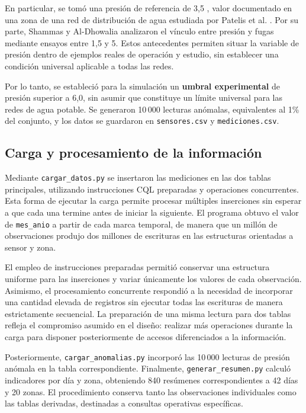 \documentclass[conference]{IEEEtran}
\begin{document}
En particular, se tomó una presión de referencia de 3,5 , valor documentado en una zona de una red de distribución de agua estudiada por Patelis et al. \cite{patelis2020}. Por su parte, Shammas y Al-Dhowalia \cite{shammas1993} analizaron el vínculo entre presión y fugas mediante ensayos entre 1,5 y 5. Estos antecedentes permiten situar la variable de presión dentro de ejemplos reales de operación y estudio, sin establecer una condición universal aplicable a todas las redes.

Por lo tanto, se estableció para la simulación un \textbf{umbral experimental} de presión superior a 6,0, sin asumir que constituye un límite universal para las redes de agua potable. Se generaron 10\,000 lecturas anómalas, equivalentes al 1\% del conjunto, y los datos se guardaron en \texttt{sensores.csv} y \texttt{mediciones.csv}.

\subsection{Carga y procesamiento de la información}

Mediante \texttt{cargar\_datos.py} se insertaron las mediciones en las dos tablas principales, utilizando instrucciones CQL preparadas y operaciones concurrentes. Esta forma de ejecutar la carga permite procesar múltiples inserciones sin esperar a que cada una termine antes de iniciar la siguiente. El programa obtuvo el valor de \texttt{mes\_anio} a partir de cada marca temporal, de manera que un millón de observaciones produjo dos millones de escrituras en las estructuras orientadas a sensor y zona.

El empleo de instrucciones preparadas permitió conservar una estructura uniforme para las inserciones y variar únicamente los valores de cada observación. Asimismo, el procesamiento concurrente respondió a la necesidad de incorporar una cantidad elevada de registros sin ejecutar todas las escrituras de manera estrictamente secuencial. La preparación de una misma lectura para dos tablas refleja el compromiso asumido en el diseño: realizar más operaciones durante la carga para disponer posteriormente de accesos diferenciados a la información.

Posteriormente, \texttt{cargar\_anomalias.py} incorporó las 10\,000 lecturas de presión anómala en la tabla correspondiente. Finalmente, \texttt{generar\_resumen.py} calculó indicadores por día y zona, obteniendo 840 resúmenes correspondientes a 42 días y 20 zonas. El procedimiento conserva tanto las observaciones individuales como las tablas derivadas, destinadas a consultas operativas específicas.
\end{document}
